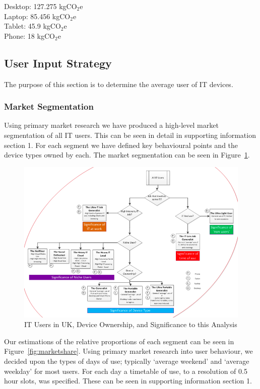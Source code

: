 \documentclass[conference]{IEEEtran}
\begin{document}
Desktop: 127.275 kgCO$_2$e\\
Laptop: 85.456 kgCO$_2$e\\
Tablet: 45.9 kgCO$_2$e\\
Phone: 18 kgCO$_2$e\\

\subsection{User Input Strategy}

The purpose of this section is to determine the average user of IT
devices.

\subsubsection{Market Segmentation}

Using primary market research we have produced a high-level market
segmentation of all IT users. This can be seen in detail in supporting
information section 1. For each segment we have defined key
behavioural points and the device types owned by each. The market
segmentation can be seen in Figure~\ref{fig:itusersuk}.

\begin{figure}[!ht]
\centering
\includegraphics[width=\textwidth]{images/ukitusers_ownership_signif.png}
\caption{IT Users in UK, Device Ownership, and Significance to this Analysis}
\label{fig:itusersuk} 
\end{figure}

Our estimations of the relative proportions of each segment can be
seen in Figure~\ref{fig:marketshare}.  Using primary market research
into user behaviour, we decided upon the types of days of use;
typically `average weekend' and `average weekday' for most users. For
each day a timetable of use, to a resolution of 0.5 hour slots, was
specified. These can be seen in supporting information section 1.
\end{document}

